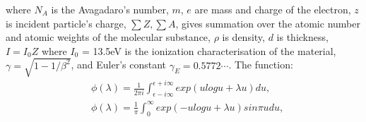 where $N_A$ is the Avagadaro's number, $m$, $e$ are mass and charge of the electron, $z$ is incident particle's charge, $\sum Z, \sum A$, gives summation over the atomic number and atomic weights of the molecular substance, $\rho$ is density, $d$ is thickness, $I=I_0 Z$ where $I_0$ = 13.5eV is the ionization characterisation of the material, $\gamma = \sqrt{1-1/\beta^2}$, and Euler's constant $\gamma_E = 0.5772 \cdots$. The function: 
\begin{equation}
\begin{aligned}
    &\phi(\lambda)= \frac{1}{2 \pi i} \int^{\epsilon + i \infty}_{\epsilon - i \infty} exp(u log u + \lambda u)du,\\
    &\phi(\lambda)= \frac{1}{\pi} \int^{\infty}_{0} exp(- u log u + \lambda u) sin \pi u du,
    \end{aligned}
\end{equation}
